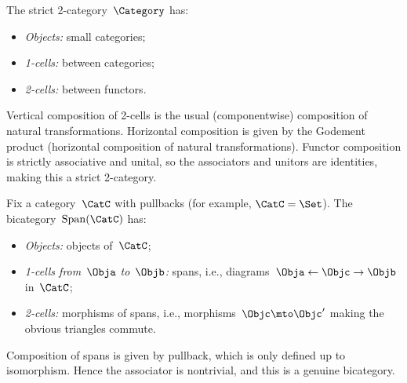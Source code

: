 \begin{example}
    \label{exa:bicat-cat}
    The strict 2-category~$\Category$ has:
    \begin{itemize}
        \item \emph{Objects:} small categories;
        \item \emph{1-cells:}  between categories;
        \item \emph{2-cells:}  between functors.
    \end{itemize}
    Vertical composition of 2-cells is the usual (componentwise) composition of natural transformations.
    Horizontal composition is given by the Godement product (horizontal composition of natural transformations).
    Functor composition is strictly associative and unital, so the associators and unitors are identities, making this a strict 2-category.
\end{example}

\begin{example}
    \label{exa:bicat-span}
    Fix a category~$\CatC$ with pullbacks (for example, $\CatC = \Set$).
    The bicategory~$\operatorname{Span}(\CatC)$ has:
    \begin{itemize}
        \item \emph{Objects:} objects of~$\CatC$;
        \item \emph{1-cells from~$\Obja$ to~$\Objb$:} spans, i.e., diagrams~$\Obja \leftarrow \Objc \rightarrow \Objb$ in~$\CatC$;
        \item \emph{2-cells:} morphisms of spans, i.e., morphisms~$\Objc \mto \Objc'$ making the obvious triangles commute.
    \end{itemize}
    Composition of spans is given by pullback, which is only defined up to isomorphism.
    Hence the associator is nontrivial, and this is a genuine bicategory.
\end{example}

